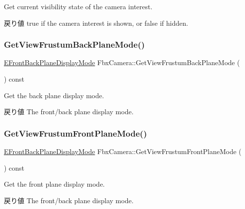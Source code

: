 Get current visibility state of the camera interest. \begin{DoxyReturn}{戻り値}
{\ttfamily true} if the camera interest is shown, or {\ttfamily false} if hidden. 
\end{DoxyReturn}
\mbox{\label{class_fbx_camera_a8ff114b2298675c573b31428ede34871}} 
\subsubsection{\texorpdfstring{Get\+View\+Frustum\+Back\+Plane\+Mode()}{GetViewFrustumBackPlaneMode()}}
{\footnotesize\ttfamily \hyperlink{class_fbx_camera_ab7b9d3e546552049a79261a444f9b44a}{E\+Front\+Back\+Plane\+Display\+Mode} Fbx\+Camera\+::\+Get\+View\+Frustum\+Back\+Plane\+Mode (\begin{DoxyParamCaption}{ }\end{DoxyParamCaption}) const}

Get the back plane display mode. \begin{DoxyReturn}{戻り値}
The front/back plane display mode. 
\end{DoxyReturn}
\mbox{\label{class_fbx_camera_a83d93dc9f981ac175f8dfecfa0cf15eb}} 
\subsubsection{\texorpdfstring{Get\+View\+Frustum\+Front\+Plane\+Mode()}{GetViewFrustumFrontPlaneMode()}}
{\footnotesize\ttfamily \hyperlink{class_fbx_camera_ab7b9d3e546552049a79261a444f9b44a}{E\+Front\+Back\+Plane\+Display\+Mode} Fbx\+Camera\+::\+Get\+View\+Frustum\+Front\+Plane\+Mode (\begin{DoxyParamCaption}{ }\end{DoxyParamCaption}) const}

Get the front plane display mode. \begin{DoxyReturn}{戻り値}
The front/back plane display mode. 
\end{DoxyReturn}
\mbox{\label{class_fbx_camera_a17d96c024f27e60b04ce3748383db422}} 
